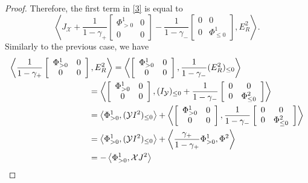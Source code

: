 \documentclass{amsart}
\theoremstyle{definition}
\theoremstyle{remark}
\numberwithin{equation}{section}
\numberwithin{theorem}{section}
\begin{document}
\begin{proof}
Therefore, the first term in \eqref{3}  is equal to 
$$
\left \langle  J_{{\mathcal X}} + \frac {1}{1-\gamma_+}
\left [\begin{array}{cc}
{\Phi}^1_{>0} & 0 \\  0 & 0\end{array}\right ] - \frac {1}{1-\gamma_-}
\left [\begin{array}{cc} 0 & 0 \\
0 & {\Phi}^1_{\leq 0} \end{array}\right ] , E_R^2
 \right \rangle.
$$
Similarly to the previous case, we have
\begin{align*}
\left \langle  \frac {1}{1-\gamma_+}
\left [\begin{array}{cc}
{\Phi}^1_{>0} & 0 \\  0 & 0\end{array}\right ], E_R^2
 \right \rangle &=
\left \langle 
\left [\begin{array}{cc}
{\Phi}^1_{>0} & 0 \\  0 & 0\end{array}\right ],  \frac {1}{1-\gamma_-}( E_R^2)_{\leq 0}
 \right \rangle\\
 &\hskip -1cm=
\left \langle 
\left [\begin{array}{cc}
{\Phi}^1_{>0} & 0 \\  0 & 0\end{array}\right ], (I_{{\mathcal Y}})_{\leq 0}+ 
\frac {1}{1-\gamma_-}\left [\begin{array}{cc} 0 & 0 \\
0 & {\Phi}^2_{\leq 0} \end{array}\right ]
 \right \rangle\\
& \hskip -1cm = \left \langle {\Phi}^1_{>0}, ({{\mathcal Y}} I^2)_{\leq 0}\right \rangle
+ \left \langle
\left [\begin{array}{cc}
{\Phi}^1_{>0} & 0 \\  0 & 0\end{array}\right],
\frac {1}{1-\gamma_-}
\left [\begin{array}{cc} 0 & 0 \\
0 & {\Phi}^2_{\leq 0} \end{array}\right]
 \right \rangle
\\
&\hskip -1cm =  \left \langle {\Phi}^1_{>0}, ({{\mathcal Y}} I^2)_{\leq 0}\right \rangle
+ \left \langle
\frac {\gamma_+}{1-\gamma_+}{\Phi}^1_{>0},
{\Phi}^2
 \right \rangle
\\
&\hskip -1cm = - \left \langle {\Phi}^1_{>0}, {{\mathcal X}} J^2\right \rangle

\end{align*}
\end{proof}
\end{document}

